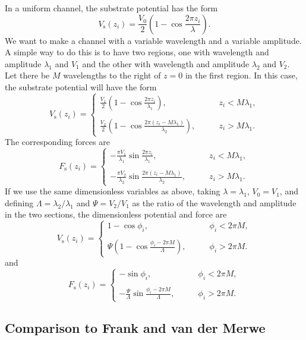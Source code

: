 \documentclass[11pt]{article}
\begin{document}
In a uniform channel, the substrate potential has the form
\[
V_\text{s}(z_i)=\frac{V_0}{2}\left(1-\cos\frac{2\pi z_i}{\lambda}\right).
\]
We want to make a channel with a variable wavelength and a variable amplitude. A simple way to do this is to have two regions, one with wavelength and amplitude $\lambda_1$ and $V_1$ and the other with wavelength and amplitude $\lambda_2$ and $V_2$. Let there be $M$ wavelengths to the right of $z=0$ in the first region. In this case, the substrate potential will have the form
\[
V_\text{s}(z_i)=\begin{cases}
	\displaystyle
	\frac{V_1}{2}\left(1-\cos\frac{2\pi z_i}{\lambda_1}\right),
		\quad&\quad
		z_i < M\lambda_1,\\\\
	\displaystyle
	\frac{V_2}{2}\left(1
		-\cos\frac{2\pi (z_i-M\lambda_1)}{\lambda_2}\right),
		\quad&\quad
		z_i > M\lambda_1.\end{cases}
\]
The corresponding forces are
\[
F_\text{s}(z_i)=\begin{cases}
	\displaystyle
	-\frac{\pi V_1}{\lambda_1}\sin\frac{2\pi z_i}{\lambda_1},
		\quad&\quad
		z_i < M\lambda_1,\\\\
	\displaystyle
	-\frac{\pi V_2}{\lambda_2}
		\sin\frac{2\pi (z_i-M\lambda_1)}{\lambda_2},
		\quad&\quad
		z_i > M\lambda_1.\end{cases}
\]
If we use the same dimensionless variables as above, taking $\lambda=\lambda_1$, $V_0=V_1$, and defining $\Lambda=\lambda_2/\lambda_1$ and $\Psi=V_2/V_1$ as the ratio of the wavelength and amplitude in the two sections, the dimensionless potential and force are
\[
V_\text{s}(z_i)=\begin{cases}
	\displaystyle 1-\cos\phi_i,
		\quad&\quad
		\phi_i < 2\pi M,\\\\
	\displaystyle \Psi\left(1 -\cos\frac{\phi_i-2\pi M}{\Lambda}\right),
		\quad&\quad
		\phi_i > 2\pi M.\end{cases}
\]
and
\[
F_\text{s}(z_i)=\begin{cases}
	\displaystyle
	-\sin\phi_i,
		\quad&\quad
		\phi_i < 2\pi M,\\\\
	\displaystyle
	-\frac{\Psi}{\Lambda}\sin\frac{\phi_i-2\pi M}{\Lambda},
		\quad&\quad
		\phi_i > 2\pi M.\end{cases}
\]

\subsection{Comparison to Frank and van der Merwe}
\end{document}
